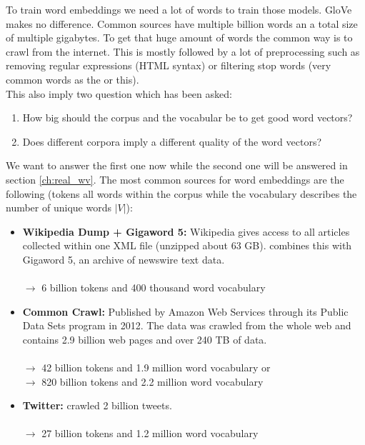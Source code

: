 To train word embeddings we need a lot of words to train those models. GloVe makes
no difference. Common sources have multiple billion words an a total size of 
multiple gigabytes. To get that huge amount of words the common way is to crawl
from the internet. This is mostly followed by a lot of preprocessing such as 
removing regular expressions (HTML syntax) or filtering stop words (very common
words as the or this). \\

This also imply two question which has been asked:
\begin{enumerate}
  \item 
    How big should the corpus and the vocabular be to get good word vectors?
  
  \item 
    Does different corpora imply a different quality of the word vectors?
\end{enumerate}

We want to answer the first one now while the second one will be answered in 
section \ref{ch:real_wv}. The most common sources for word embeddings are the
following (tokens all words within the corpus while the vocabulary 
describes the number of unique words $|V|$):

\begin{itemize}
  \item 
    \textbf{Wikipedia Dump + Gigaword 5:} Wikipedia gives access to all articles 
    collected within one XML file (unzipped about 63 GB). \cite{pennington2014glove} 
    combines this with Gigaword 5, an archive of newswire text data. \\ \\
    $\rightarrow$ 6 billion tokens and 400 thousand word vocabulary

  \item 
    \textbf{Common Crawl:} Published by Amazon Web Services through its Public Data 
    Sets program in 2012. The data was crawled from the whole web and contains 
    2.9 billion web pages and over 240 TB of data. \\ \\
    $\rightarrow$ 42 billion tokens and 1.9 million word vocabulary or \\
    $\rightarrow$ 820 billion tokens and 2.2 million word vocabulary
  
  \item 
    \textbf{Twitter:} \cite{pennington2014glove} crawled 2 billion tweets. \\ \\
    $\rightarrow$ 27 billion tokens and 1.2 million word vocabulary
\end{itemize}
  
